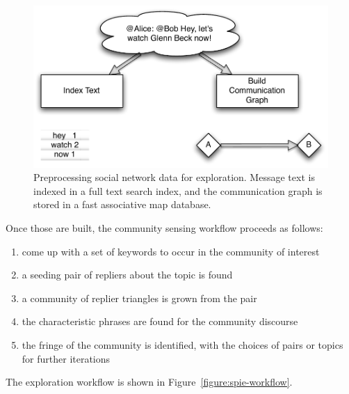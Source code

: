\documentclass[10pt,oneside]{memoir}
\begin{document}
\begin{figure}[htp]
\begin{center}
\includegraphics{figures/spie-preprocessing}
\caption{Preprocessing social network data for exploration.  Message text is indexed in a full text search index, and the communication graph is stored in a fast associative map database.}
\label{figure:spie-preprocessing}
\end{center}
\end{figure}
Once those are built, the community sensing workflow proceeds as
follows:


\begin{enumerate}


\item come up with a set of keywords to occur in the community of
interest




\item a seeding pair of repliers about the topic is found




\item a community of replier triangles is grown from the pair




\item the characteristic phrases are found for the community
discourse




\item the fringe of the community is identified, with the choices of
pairs or topics for further iterations



\end{enumerate}

The exploration workflow is shown in Figure~\ref{figure:spie-workflow}.
\end{document}

